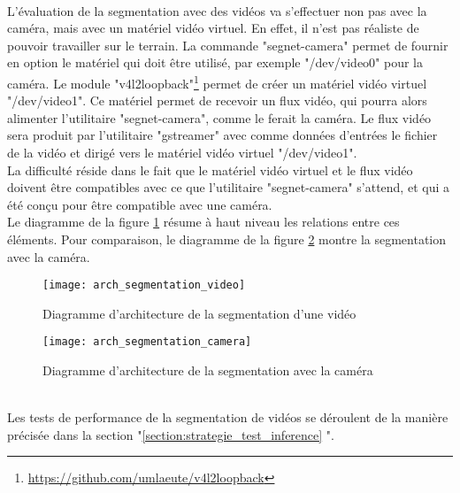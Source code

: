 ﻿
\vspace{\baselineskip}
\\
\noindent L'évaluation de la segmentation avec des vidéos va s'effectuer non pas avec la caméra, mais avec un matériel vidéo virtuel. En effet, il n'est pas réaliste de pouvoir travailler sur le terrain. La commande "segnet-camera" permet de fournir en option le matériel qui doit être utilisé, par exemple "/dev/video0" pour la caméra. Le module "v4l2loopback"\footnote{\url{https://github.com/umlaeute/v4l2loopback}} permet de créer un matériel vidéo virtuel "/dev/video1". Ce matériel permet de recevoir un flux vidéo, qui pourra alors alimenter l'utilitaire "segnet-camera", comme le ferait la caméra. Le flux vidéo sera produit par l'utilitaire "gstreamer" avec comme données d'entrées le fichier de la vidéo et dirigé vers le matériel vidéo virtuel "/dev/video1".
\vspace{\baselineskip}
\\
\noindent La difficulté réside dans le fait que le matériel vidéo virtuel et le flux vidéo doivent être compatibles avec ce que l'utilitaire "segnet-camera" s'attend, et qui a été conçu pour être compatible avec une caméra. 
\vspace{\baselineskip}
\\
\noindent Le diagramme de la figure \ref{fig:arch_segmentation_video} résume à haut niveau les relations entre ces éléments. Pour comparaison, le diagramme de la figure \ref{fig:arch_segmentation_camera} montre la segmentation avec la caméra. 
\begin{figure}[H]
    \centering
    \texttt{[image: arch\_segmentation\_video]}
    \caption[Diagramme d'architecture de la segmentation d'une vidéo]{Diagramme d'architecture de la segmentation d'une vidéo}
    \label{fig:arch_segmentation_video}
\end{figure}
\begin{figure}[H]
    \centering
    \texttt{[image: arch\_segmentation\_camera]}
    \caption[Diagramme d'architecture de la segmentation avec la caméra]{Diagramme d'architecture de la segmentation avec la caméra}
    \label{fig:arch_segmentation_camera}
\end{figure}
\vspace{\baselineskip}
\\
\noindent Les tests de performance de la segmentation de vidéos se déroulent de la manière précisée dans la section "\ref{section:strategie_test_inference} ". 
